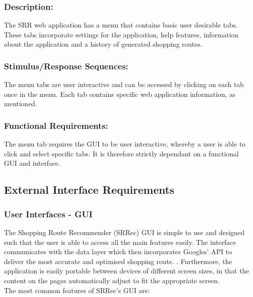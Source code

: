 \documentclass[10pt,twocolumn]{witseiepaper}
\begin{document}
		\subsubsection*{Description:}
		
		The SRR web application has a menu that contains basic user desirable tabs. These tabs incorporate settings for the application, help features, information about the application and a history of generated shopping routes. 
		
		\subsubsection*{Stimulus/Response Sequences:}
		
		The menu tabs are user interactive and can be accessed by clicking on each tab once in the menu. Each tab contains specific web application information, as mentioned. 
		
		\subsubsection*{Functional Requirements:}
		
		The menu tab requires the GUI to be user interactive, whereby a user is able to click and select specific tabs. It is therefore strictly dependant on a functional GUI and interface.
		
		
		\subsection{External Interface Requirements}
		
		\subsubsection{User Interfaces - GUI}
		
		The Shopping Route Recommender (SRRec) GUI is simple to use and designed such that the user is able to access all the main features easily. The interface communicates with the data layer which then incorporates Googles' API to deliver the most accurate and optimised shopping route. . Furthermore, the application is easily portable between devices of different screen sizes, in that the content on the pages automatically adjust to fit the appropriate screen.\\
		
		The most common features of SRRec's GUI are:
		
\end{document}
